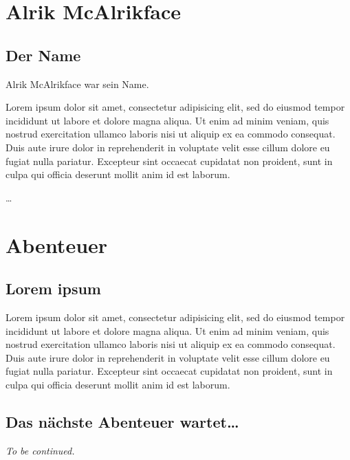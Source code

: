 \documentclass[DIV=calc]{scrartcl}
\begin{document}
  \section{Alrik McAlrikface}
    \subsection{Der Name}
      \begin{itquote}
        Alrik McAlrikface war sein Name.
      \end{itquote}

      Lorem ipsum dolor sit amet, consectetur adipisicing elit, sed do eiusmod tempor incididunt ut labore et dolore magna aliqua. Ut enim ad minim veniam, quis nostrud exercitation ullamco laboris nisi ut aliquip ex ea commodo consequat. Duis aute irure dolor in reprehenderit in voluptate velit esse cillum dolore eu fugiat nulla pariatur. Excepteur sint occaecat cupidatat non proident, sunt in culpa qui officia deserunt mollit anim id est laborum.

      …

  \section{Abenteuer}
    \subsection{Lorem ipsum}

    Lorem ipsum dolor sit amet, consectetur adipisicing elit, sed do eiusmod tempor incididunt ut labore et dolore magna aliqua. Ut enim ad minim veniam, quis nostrud exercitation ullamco laboris nisi ut aliquip ex ea commodo consequat. Duis aute irure dolor in reprehenderit in voluptate velit esse cillum dolore eu fugiat nulla pariatur. Excepteur sint occaecat cupidatat non proident, sunt in culpa qui officia deserunt mollit anim id est laborum.

    \subsection{Das nächste Abenteuer wartet…}
    \emph{To be continued.}
\end{document}
